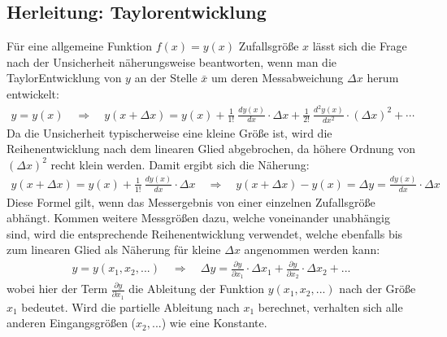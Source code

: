 \documentclass[letterpaper,10pt,english]{jupyterBook}
\begin{document}
\subsection{Herleitung: Taylorentwicklung}
\label{\detokenize{content/1_Fehlerfortpflanzung:herleitung-taylorentwicklung}}
\sphinxAtStartPar
Für eine allgemeine Funktion \(f(x) = y(x)\)  Zufallsgröße \(x\) lässt sich die Frage
nach der Unsicherheit näherungsweise beantworten, wenn man
die Taylor\sphinxhyphen{}Entwicklung von \(y\) an der Stelle \(\bar x\) um deren Messabweichung \(\Delta x\) herum entwickelt:
\begin{equation*}
\begin{split}y = y(x)\quad \Rightarrow \quad y(x+\Delta x)= y(x) + \frac1{1!}\ \frac{dy(x)}{dx} \cdot \Delta x + \frac1{2!}\ \frac{d^2 y(x)}{d x^2}\cdot (\Delta x)^2 + \cdots\end{split}
\end{equation*}
\sphinxAtStartPar
Da die Unsicherheit typischerweise eine kleine Größe ist, wird die Reihenentwicklung nach dem linearen Glied abgebrochen, da höhere Ordnung von \((\Delta x)^2\) recht klein werden. Damit ergibt sich die Näherung:
\begin{equation*}
\begin{split} y(x+\Delta x)= y(x) + \frac1{1!}\ \frac{dy(x)}{dx} \cdot \Delta x \quad \Rightarrow \quad y(x+\Delta x) - y(x) = \Delta y =  \frac{dy(x)}{dx} \cdot \Delta x\end{split}
\end{equation*}
\sphinxAtStartPar
Diese Formel gilt, wenn das Messergebnis von einer einzelnen Zufallsgröße abhängt. Kommen weitere Messgrößen dazu, welche voneinander unabhängig sind, wird die entsprechende Reihenentwicklung verwendet, welche ebenfalls bis zum linearen Glied als Näherung für kleine \(\Delta x\) angenommen werden kann:
\begin{equation*}
\begin{split}y = y(x_1, x_2, ...)  \quad \Rightarrow \quad \Delta y = \frac{\partial y}{\partial x_1} \cdot \Delta x_1 + \frac{\partial y}{\partial x_2} \cdot \Delta x_2 + ...\end{split}
\end{equation*}
\sphinxAtStartPar
wobei hier der Term \(\frac{\partial y}{\partial x_1}\) die  Ableitung der Funktion \(y(x_1, x_2, ...)\) nach der Größe \(x_1\) bedeutet. Wird die partielle Ableitung nach \(x_1\) berechnet, verhalten sich alle anderen Eingangsgrößen (\(x_2, ...\)) wie eine Konstante.
\end{document}
